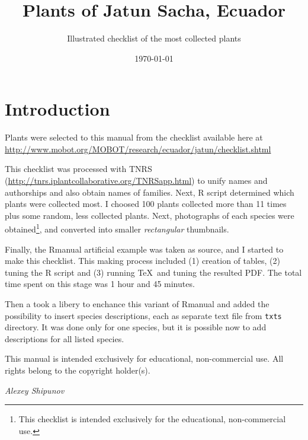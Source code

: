 \documentclass[12pt]{report} %
\title{Plants of Jatun Sacha, Ecuador}
\author{Illustrated checklist of the most collected plants}
\date{\today}
\begin{document}
\maketitle

\tableofcontents

\sloppy %

\newpage

\section*{Introduction}

Plants were selected to this manual from the checklist available here at
\url{http://www.mobot.org/MOBOT/research/ecuador/jatun/checklist.shtml}

This checklist was processed with TNRS
(\url{http://tnrs.iplantcollaborative.org/TNRSapp.html}) to unify names
and authorships and also obtain names of families. Next, R script
determined which plants were collected most. I choosed 100 plants
collected more than 11 times plus some random, less collected plants.
Next, photographs of each species were obtained\footnote{This checklist
is intended exclusively for the educational, non-commercial use.}, and
converted into smaller \emph{rectangular} thumbnails.

Finally, the \textsf{Rmanual} artificial example was taken as source, and
I started to make this checklist. This making process included (1)
creation of tables, (2) tuning the \textsf{R} script and (3) running
\TeX\ and tuning the resulted PDF. The total time spent on this stage was
1 hour and 45 minutes.

Then a took a libery to enchance this variant of \textsf{Rmanual} and
added the possibility to insert species descriptions, each as separate
text file from \texttt{txts} directory. It was done only for one species,
but it is possible now to add descriptions for all listed species.

This manual is intended exclusively for educational, non-commercial use.
All rights belong to the copyright holder(s).

\bigskip

\hfill\emph{Alexey Shipunov}

\newpage


\end{document}
